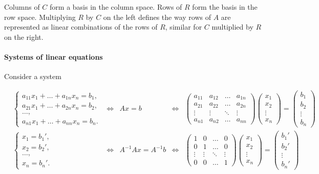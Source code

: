 \documentclass{article}
\begin{document}
Columns of $C$ form a basis in the column space. Rows of $R$ form the basis in the row space. Multiplying $R$ by $C$ on the left defines the way rows of $A$ are represented as linear combinations of the rows of $R$, similar for $C$ multiplied by $R$ on the right.

\paragraph{Systems of linear equations} Consider a system

\begin{align*}
&\begin{cases}
a_{11} x_1 + \dots + a_{1n} x_n = b_1, \\
a_{21} x_1 + \dots + a_{2n} x_n = b_2, \\
\dots, \\
a_{n1} x_1 + \dots + a_{nn} x_n = b_n.
\end{cases} &\iff& Ax = b &\iff&
\begin{pmatrix}
    a_{11} & a_{12} & \dots & a_{1n} \\
    a_{21} & a_{22} & \dots & a_{2n} \\
    \vdots & \vdots & \ddots & \vdots \\
    a_{n1} & a_{n2} & \dots & a_{nn}
\end{pmatrix} \begin{pmatrix}
    x_1 \\ x_2 \\ \vdots \\ x_n
\end{pmatrix} = \begin{pmatrix}
    b_1 \\ b_2 \\ \vdots \\ b_n
\end{pmatrix}& \\
&\begin{cases}
x_1 = b_1', \\
x_2 = b_2', \\
\dots, \\
x_n = b_n'.
\end{cases} &\iff& A^{-1} A x = A^{-1} b &\iff& \begin{pmatrix}
    1 & 0 & \dots & 0 \\
    0 & 1 & \dots & 0 \\
    \vdots & \vdots & \ddots & \vdots \\
    0 & 0 & \dots & 1
\end{pmatrix} \begin{pmatrix}
    x_1 \\ x_2 \\ \vdots \\ x_n
\end{pmatrix} = \begin{pmatrix}
    b_1' \\ b_2' \\ \vdots \\ b_n'
\end{pmatrix}&
\end{align*}
\end{document}
